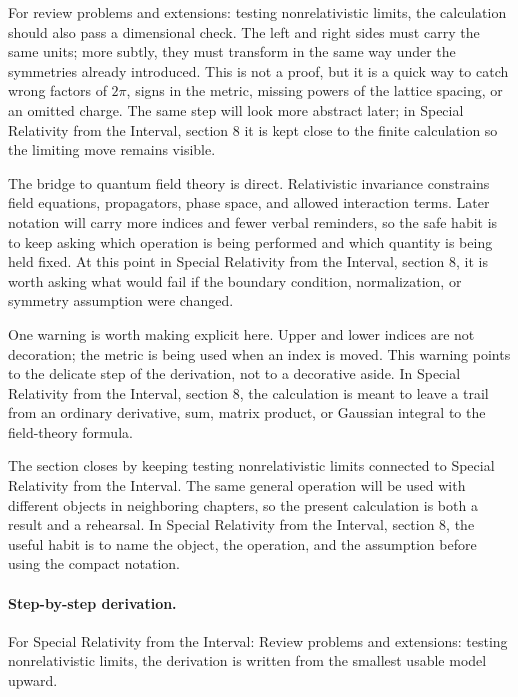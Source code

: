 For review problems and extensions: testing nonrelativistic limits, the calculation should also pass a dimensional check.  The left and right sides must carry the same units; more subtly, they must transform in the same way under the symmetries already introduced.  This is not a proof, but it is a quick way to catch wrong factors of \(2\pi\), signs in the metric, missing powers of the lattice spacing, or an omitted charge.  The same step will look more abstract later; in Special Relativity from the Interval, section 8 it is kept close to the finite calculation so the limiting move remains visible.

The bridge to quantum field theory is direct.  Relativistic invariance constrains field equations, propagators, phase space, and allowed interaction terms.  Later notation will carry more indices and fewer verbal reminders, so the safe habit is to keep asking which operation is being performed and which quantity is being held fixed.  At this point in Special Relativity from the Interval, section 8, it is worth asking what would fail if the boundary condition, normalization, or symmetry assumption were changed.

One warning is worth making explicit here.  Upper and lower indices are not decoration; the metric is being used when an index is moved.  This warning points to the delicate step of the derivation, not to a decorative aside.  In Special Relativity from the Interval, section 8, the calculation is meant to leave a trail from an ordinary derivative, sum, matrix product, or Gaussian integral to the field-theory formula.

The section closes by keeping testing nonrelativistic limits connected to Special Relativity from the Interval.  The same general operation will be used with different objects in neighboring chapters, so the present calculation is both a result and a rehearsal.  In Special Relativity from the Interval, section 8, the useful habit is to name the object, the operation, and the assumption before using the compact notation.



\paragraph{Step-by-step derivation.}

For Special Relativity from the Interval: Review problems and extensions: testing nonrelativistic limits, the derivation is written from the smallest usable model upward.

